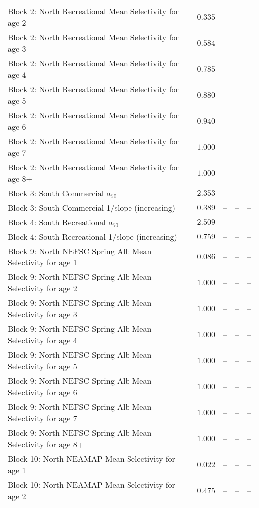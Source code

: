 \documentclass[
]{article}
\begin{document}
\begin{landscape}
\begin{longtable}[t]{lrrrr}
\addlinespace
Block 2: North Recreational Mean Selectivity for age 2 & $0.335$ & -- & -- & --\\
Block 2: North Recreational Mean Selectivity for age 3 & $0.584$ & -- & -- & --\\
Block 2: North Recreational Mean Selectivity for age 4 & $0.785$ & -- & -- & --\\
Block 2: North Recreational Mean Selectivity for age 5 & $0.880$ & -- & -- & --\\
Block 2: North Recreational Mean Selectivity for age 6 & $0.940$ & -- & -- & --\\
\addlinespace
Block 2: North Recreational Mean Selectivity for age 7 & $1.000$ & -- & -- & --\\
Block 2: North Recreational Mean Selectivity for age 8+ & $1.000$ & -- & -- & --\\
Block 3: South Commercial $a_{50}$ & $2.353$ & -- & -- & --\\
Block 3: South Commercial 1/slope (increasing) & $0.389$ & -- & -- & --\\
Block 4: South Recreational $a_{50}$ & $2.509$ & -- & -- & --\\
\addlinespace
Block 4: South Recreational 1/slope (increasing) & $0.759$ & -- & -- & --\\
Block 9: North NEFSC Spring Alb Mean Selectivity for age 1 & $0.086$ & -- & -- & --\\
Block 9: North NEFSC Spring Alb Mean Selectivity for age 2 & $1.000$ & -- & -- & --\\
Block 9: North NEFSC Spring Alb Mean Selectivity for age 3 & $1.000$ & -- & -- & --\\
Block 9: North NEFSC Spring Alb Mean Selectivity for age 4 & $1.000$ & -- & -- & --\\
\addlinespace
Block 9: North NEFSC Spring Alb Mean Selectivity for age 5 & $1.000$ & -- & -- & --\\
Block 9: North NEFSC Spring Alb Mean Selectivity for age 6 & $1.000$ & -- & -- & --\\
Block 9: North NEFSC Spring Alb Mean Selectivity for age 7 & $1.000$ & -- & -- & --\\
Block 9: North NEFSC Spring Alb Mean Selectivity for age 8+ & $1.000$ & -- & -- & --\\
Block 10: North NEAMAP Mean Selectivity for age 1 & $0.022$ & -- & -- & --\\
\addlinespace
Block 10: North NEAMAP Mean Selectivity for age 2 & $0.475$ & -- & -- & --\\

\end{longtable}
\end{landscape}
\end{document}
